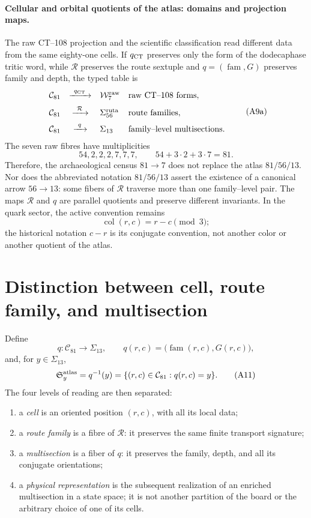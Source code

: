 \paragraph{Cellular and orbital quotients of the atlas: domains and projection maps.}
The raw CT--108 projection and the scientific classification read different
data from the same eighty-one cells. If
\(q_{\rm CT}\) preserves only the form of the dodecaphase tritic word,
while \(\mathcal R\) preserves the route sextuple and
\(q=(\operatorname{fam},G)\) preserves family and depth, the typed
table is
\[
\begin{array}{rcll}
 \mathcal C_{81}
 &\xrightarrow{\ q_{\rm CT}\ }&
 \mathcal W^{\rm raw}_{7}
 & \text{raw CT--108 forms},\\[2mm]
 \mathcal C_{81}
 &\xrightarrow{\ \mathcal R\ }&
 \Sigma^{\rm ruta}_{56}
 & \text{route families},\\[2mm]
 \mathcal C_{81}
 &\xrightarrow{\ q\ }&
 \Sigma_{13}
 & \text{family--level multisections}.
\end{array}
\tag{A9a}\label{eq:dos-cocientes-atlas-rev8}
\]
The seven raw fibres have multiplicities
\[
 54,2,2,2,7,7,7,
 \qquad54+3\cdot2+3\cdot7=81.
\]
Therefore, the archaeological census \(81\to7\) does not replace the atlas \(81/56/13\). Nor does the abbreviated notation \(81/56/13\) assert the existence of a canonical arrow \(56\to13\): some fibers of \(\mathcal R\) traverse more than one family--level pair. The maps \(\mathcal R\) and \(q\) are parallel quotients and preserve different invariants. In the quark sector, the active convention remains
\[
 \operatorname{col}(r,c)=r-c\pmod3;
\]
the historical notation \(c-r\) is its conjugate convention, not another color or
another quotient of the atlas.

\section{Distinction between cell, route family, and multisection}

Define
\[
 q:\mathcal C_{81}\longrightarrow\Sigma_{13},
 \qquad
 q(r,c)=\bigl(\operatorname{fam}(r,c),G(r,c)\bigr),
 \tag{A10}\label{eq:cociente-trece-multisecciones}
\]
and, for \(y\in\Sigma_{13}\),
\[
 \mathfrak S_y^{\rm atlas}
 =q^{-1}(y)
 =\{(r,c)\in\mathcal C_{81}:q(r,c)=y\}.
 \tag{A11}\label{eq:multiseccion-atlas-rev6}
\]
The four levels of reading are then separated:

\begin{enumerate}[label=(\roman*)]
 \item a \emph{cell} is an oriented position \((r,c)\), with all its
 local data;
 \item a \emph{route family} is a fibre of \(\mathcal R\): it preserves
 the same finite transport signature;
 \item a \emph{multisection} is a fiber of \(q\): it preserves the family,
 depth, and all its conjugate orientations;
 \item a \emph{physical representation} is the subsequent realization of an
enriched multisection in a state space; it is not another partition of the
board or the arbitrary choice of one of its cells.
\end{enumerate}

